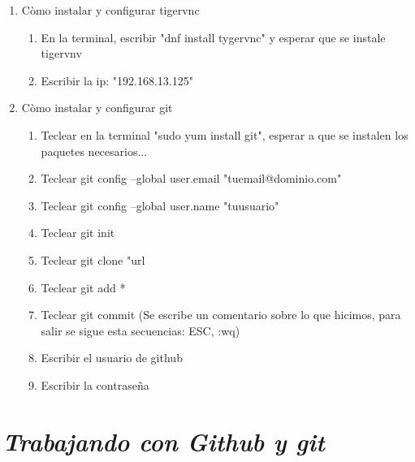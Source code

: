 \documentclass{book}
\begin{document}
\begin{enumerate}
\begin{itemize}
		
	\end{itemize}%
	\item Còmo instalar y configurar tigervnc
	\begin{enumerate}
		\item En la terminal, escribir "dnf install tygervnc" y esperar que se instale tigervnv
		\item Escribir la ip: "192.168.13.125"
	\end{enumerate}
	\item Còmo instalar y configurar git
	\begin{enumerate}
		\item Teclear en la terminal "sudo yum install git", esperar a que se instalen los paquetes necesarios...
		\item Teclear  git config --global user.email "tuemail@dominio.com"
		\item Teclear  git config --global user.name "tuusuario"      
		\item Teclear  git init
		\item Teclear  git clone "url
		\item Teclear git add *
		\item Teclear git commit (Se escribe un comentario sobre lo que hicimos, para salir se sigue esta secuencias: ESC, :wq)
		\item Escribir el usuario de github
		\item Escribir la contraseña
	\end{enumerate}
	
	
	
	
	\end{enumerate}%



   \section{\textit{Trabajando con Github y git}}%
\begin{flushright}
	\date{09 de enero de 2019}
\end{flushright}
   
\end{document}
